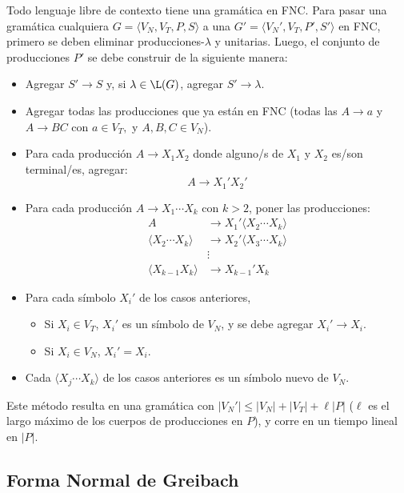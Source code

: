 Todo lenguaje libre de contexto tiene una gramática en FNC. Para pasar una gramática cualquiera $G = \langle V_N, V_T, P, S \rangle$ a una $G' = \langle V_N', V_T, P', S' \rangle$ en FNC, primero se deben eliminar producciones-$\lambda$ y unitarias. Luego, el conjunto de producciones $P'$ se debe construir de la siguiente manera:
\begin{itemize}
    \item Agregar $S' \to S$ y, si $\lambda \in \L(G)$, agregar $S' \to \lambda$.
    \item Agregar todas las producciones que ya están en FNC (todas las $A \to a$ y $A \to BC$ con $a \in V_T,$ y $A,B,C \in V_N$).
    \item Para cada producción $A \to X_1 X_2$ donde alguno/s de $X_1$ y $X_2$ es/son terminal/es, agregar:
    $$
        A \to X_1' X_2'
    $$
    \item Para cada producción $A \to X_1 \cdots X_k$ con $k > 2$, poner las producciones:
    $$
    \begin{aligned}
        A & \to X_1' \langle X_2 \cdots X_k \rangle \\
        \langle X_2 \cdots X_k \rangle & \to X_2' \langle X_3 \cdots X_k \rangle \\
        & \vdots \\
        \langle X_{k - 1} X_k \rangle & \to X_{k - 1}' X_k
    \end{aligned}
    $$
    \item Para cada símbolo $X_i'$ de los casos anteriores,
    \begin{itemize}
        \item Si $X_i \in V_T$, $X_i'$ es un símbolo de $V_N$, y se debe agregar $X_i' \to X_i$.
        \item Si $X_i \in V_N$, $X_i' = X_i$.
    \end{itemize}
    \item Cada $\langle X_j \cdots X_k \rangle$ de los casos anteriores es un símbolo nuevo de $V_N$.
\end{itemize}

Este método resulta en una gramática con $|V_N'| \leq |V_N| + |V_T| + \ell |P|$ ($\ell$ es el largo máximo de los cuerpos de producciones en $P$), y corre en un tiempo lineal en $|P|$.

\subsection{Forma Normal de Greibach}

